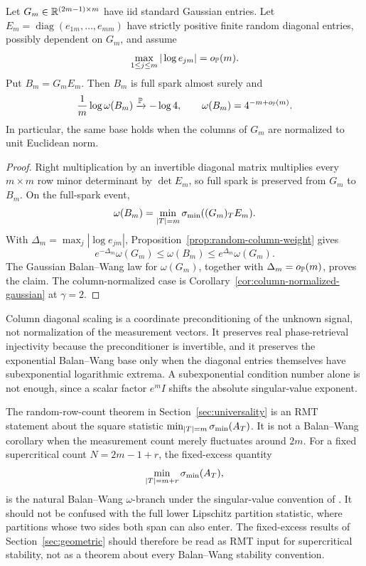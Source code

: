 \begin{corollary}\label{cor:pr-diagonal-preconditioned}
Let \(G_m\in\mathbb{R}^{(2m-1)\times m}\) have iid standard Gaussian entries.  Let
\(E_m=\operatorname{diag}(e_{1m},\ldots,e_{mm})\) have strictly positive finite
random diagonal entries, possibly dependent on \(G_m\), and assume
\[
  \max_{1\le j\le m}|\log e_{jm}|=o_{\mathbb{P}}(m).
\]
Put \(B_m=G_mE_m\).  Then \(B_m\) is full spark almost surely and
\[
  \frac1m\log\omega(B_m)\xrightarrow{\mathbb{P}}-\log4,
  \qquad
  \omega(B_m)=4^{-m+o_{\mathbb{P}}(m)}.
\]
In particular, the same base holds when the columns of \(G_m\) are normalized
to unit Euclidean norm.
\end{corollary}

\begin{proof}
Right multiplication by an invertible diagonal matrix multiplies every
\(m\times m\) row minor determinant by \(\det E_m\), so full spark is preserved
from \(G_m\) to \(B_m\).  On the full-spark event,
\[
  \omega(B_m)=\min_{|T|=m}\sigma_{\min}((G_m)_T E_m).
\]
With \(\Delta_m=\max_j|\log e_{jm}|\), Proposition~\ref{prop:random-column-weight}
gives
\[
  e^{-\Delta_m}\omega(G_m)\le \omega(B_m)\le e^{\Delta_m}\omega(G_m).
\]
The Gaussian Balan--Wang law for \(\omega(G_m)\), together with
\(\Delta_m=o_{\mathbb{P}}(m)\), proves the claim.  The column-normalized case is
Corollary~\ref{cor:column-normalized-gaussian} at \(\gamma=2\).
\end{proof}

\begin{remark}
Column diagonal scaling is a coordinate preconditioning of the unknown signal,
not normalization of the measurement vectors.  It preserves real
phase-retrieval injectivity because the preconditioner is invertible, and it
preserves the exponential Balan--Wang base only when the diagonal entries
themselves have subexponential logarithmic extrema.  A subexponential condition
number alone is not enough, since a scalar factor \(e^m I\) shifts the absolute
singular-value exponent.
\end{remark}

\begin{remark}
The random-row-count theorem in Section~\ref{sec:universality} is an RMT
statement about the square statistic \(\min_{|T|=m}\sigma_{\min}(A_T)\).  It is not a
Balan--Wang corollary when the measurement count merely fluctuates around
\(2m\).  For a fixed supercritical count \(N=2m-1+r\), the fixed-excess quantity
\[
  \min_{|T|=m+r}\sigma_{\min}(A_T),
\]
is the natural Balan--Wang \(\omega\)-branch under the singular-value convention
of \cite{BalanWang2015}.  It should not be confused with the full lower
Lipschitz partition statistic, where partitions whose two sides both span can
also enter.  The fixed-excess results of Section~\ref{sec:geometric} should
therefore be read as RMT input for supercritical stability, not as a theorem
about every Balan--Wang stability convention.
\end{remark}


